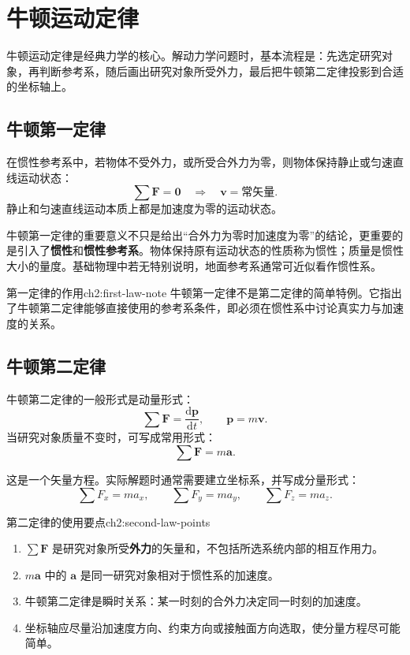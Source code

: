
\section{牛顿运动定律}

牛顿运动定律是经典力学的核心。解动力学问题时，基本流程是：先选定研究对象，再判断参考系，随后画出研究对象所受外力，最后把牛顿第二定律投影到合适的坐标轴上。

\subsection{牛顿第一定律}

在惯性参考系中，若物体不受外力，或所受合外力为零，则物体保持静止或匀速直线运动状态：
\[
    \sum \boldsymbol F=\boldsymbol 0
    \quad \Longrightarrow \quad
    \boldsymbol v=\text{常矢量}.
\]
静止和匀速直线运动本质上都是加速度为零的运动状态。

牛顿第一定律的重要意义不只是给出“合外力为零时加速度为零”的结论，更重要的是引入了\textbf{惯性}和\textbf{惯性参考系}。物体保持原有运动状态的性质称为惯性；质量是惯性大小的量度。基础物理中若无特别说明，地面参考系通常可近似看作惯性系。

\begin{attention}{第一定律的作用}{ch2:first-law-note}
牛顿第一定律不是第二定律的简单特例。它指出了牛顿第二定律能够直接使用的参考系条件，即必须在惯性系中讨论真实力与加速度的关系。
\end{attention}

\subsection{牛顿第二定律}

牛顿第二定律的一般形式是动量形式：
\[
    \sum \boldsymbol F=\frac{\mathrm d\boldsymbol p}{\mathrm dt},
    \qquad
    \boldsymbol p=m\boldsymbol v.
\]
当研究对象质量不变时，可写成常用形式：
\[
    \boxed{\sum \boldsymbol F=m\boldsymbol a}.
\]

这是一个矢量方程。实际解题时通常需要建立坐标系，并写成分量形式：
\[
    \sum F_x=ma_x,\qquad
    \sum F_y=ma_y,\qquad
    \sum F_z=ma_z.
\]

\begin{knowledge}{第二定律的使用要点}{ch2:second-law-points}
\begin{enumerate}
    \item $\sum \boldsymbol F$ 是研究对象所受\textbf{外力}的矢量和，不包括所选系统内部的相互作用力。
    \item $m\boldsymbol a$ 中的 $\boldsymbol a$ 是同一研究对象相对于惯性系的加速度。
    \item 牛顿第二定律是瞬时关系：某一时刻的合外力决定同一时刻的加速度。
    \item 坐标轴应尽量沿加速度方向、约束方向或接触面方向选取，使分量方程尽可能简单。
\end{enumerate}
\end{knowledge}

